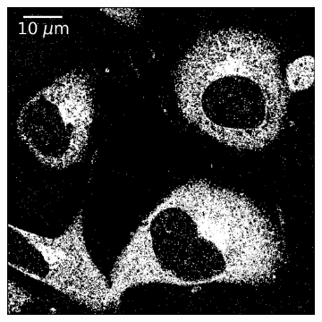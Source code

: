 \begin{figure}[htbp]
    \begin{subfigure}{0.49\textwidth}
        \includegraphics[width=\textwidth]{figures/clathrin_image10.png}
        \caption{}
    \end{subfigure}
    \begin{subfigure}{0.49\textwidth}

\end{subfigure}
\end{figure}

